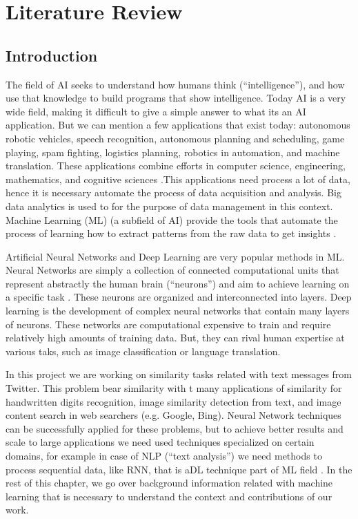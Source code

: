 \documentclass[12pt]{report}
\begin{document}
\onehalfspacing

\chapter{Literature Review} \label{chapter 2}
\section{Introduction}

The field of \ac{AI} seeks to understand how humans think (``intelligence''), and how use that knowledge to build programs that show intelligence. 
Today \ac{AI} is a very wide field, making it difficult to give a simple answer to what its an AI application. But we can mention a few applications that exist today:  autonomous robotic vehicles, speech recognition, autonomous planning and scheduling, game playing, spam fighting, logistics planning, robotics in 
automation, and machine translation. These applications combine efforts in computer science, engineering, mathematics, and cognitive sciences \cite{Russell2010}.This applications need process a lot of data, hence it is necessary automate the process of data acquisition and analysis. 
Big data analytics is used to for the purpose of data management in this context.  Machine Learning (\ac{ML})  (a subfield of \ac{AI}) provide the tools  that automate the process of learning  how to extract patterns from the raw data to get insights \cite{Kelleher2015}.

Artificial Neural Networks and Deep Learning are very popular methods in \ac{ML}. Neural Networks are simply a collection of connected computational 
units that represent abstractly the human brain (“neurons”) and  aim to achieve learning on a specific task \cite{Russell2010}. These neurons are organized and interconnected into layers. Deep learning is the development of complex neural networks that contain many layers of neurons. These networks are computational expensive to train and require relatively high amounts of training data. But, they can rival human expertise at various taks, such as image classification or language translation.  

In this project we are working on similarity tasks related with text messages from Twitter. This problem bear similarity with t many applications of similarity for handwritten digits recognition, image similarity detection from text, and image content search  in  web searchers (e.g. Google, Bing).  Neural Network techniques can be successfully applied for these problems, but to achieve better results and scale to large applications we need used techniques specialized on certain domains, for example in case of \ac{NLP} (``text analysis'') we need methods to process sequential data, like {RNN}, that is a{DL} technique part of {ML} field \cite{Goodfellow2016}.  In the rest of this chapter, we go over background information related with machine learning that is necessary to understand the context and contributions of our work.
\end{document}
